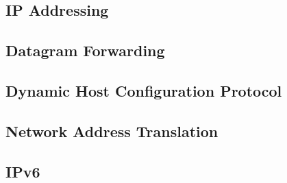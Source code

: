 \subsection{IP Addressing}

\subsection{Datagram Forwarding}

\subsection{Dynamic Host Configuration Protocol}

\subsection{Network Address Translation}

\subsection{IPv6}
